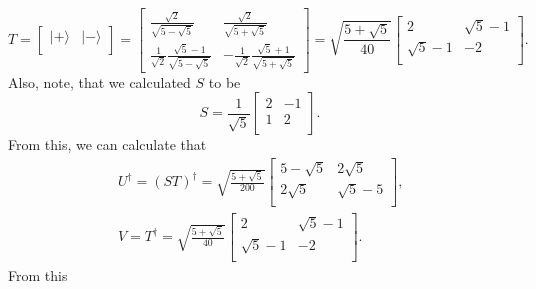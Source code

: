 \documentclass[a4paper,12pt]{article}
\newcommand{\ra}{\rangle}
\begin{document}
    \begin{equation}
        T =
        \begin{bmatrix}
            | + \ra & | - \ra\\
        \end{bmatrix} =
        \begin{bmatrix}
            \frac{\sqrt{2}}{\sqrt{5 - \sqrt{5}}} & \frac{\sqrt{2}}{\sqrt{5 + \sqrt{5}}}\\
            \frac{1}{\sqrt{2}} \frac{\sqrt{5} - 1}{\sqrt{5 - \sqrt{5}}} & - \frac{1}{\sqrt{2}} \frac{\sqrt{5} + 1}{\sqrt{5 + \sqrt{5}}}
        \end{bmatrix}
        =
        \sqrt{\frac{5+\sqrt{5}}{40}}
        \begin{bmatrix}
            2 & \sqrt{5} - 1\\
            \sqrt{5} - 1 & -2\\
        \end{bmatrix}
        \textrm{.}
    \end{equation}
    Also, note, that we calculated $S$ to be
    \begin{equation}
        S = \frac{1}{\sqrt{5}}
        \begin{bmatrix}
            2 & -1\\
            1 & 2\\
        \end{bmatrix}
        \textrm{.}
    \end{equation}
    From this, we can calculate that
    \begin{gather}
        \nonumber
        U^\dagger = (ST)^\dagger =
        \sqrt{ \frac{ 5 + \sqrt{5} }{200} }
        \begin{bmatrix}
            5 - \sqrt{5} & 2\sqrt{5}\\
            2\sqrt{5} & \sqrt{5} - 5\\
        \end{bmatrix} \textrm{,} \\
        V = T^\dagger = 
        \sqrt{\frac{5+\sqrt{5}}{40}}
        \begin{bmatrix}
            2 & \sqrt{5} - 1\\
            \sqrt{5} - 1 & -2\\
        \end{bmatrix} \textrm{.}
    \end{gather}
    From this
\end{document}
